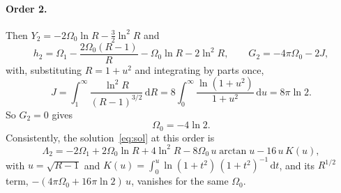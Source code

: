 \documentclass[11pt]{article}
\theoremstyle{remark}
\newcommand{\dd}{\mathrm{d}}
\begin{document}
\paragraph{Order 2.} Then $Y_2=-2\Omega_0\ln R-\tfrac32\ln^2R$ and
\begin{equation}
h_2=\Omega_1-\frac{2\Omega_0(R-1)}{R}-\Omega_0\ln R-2\ln^2R,\qquad G_2=-4\pi\Omega_0-2J,
\end{equation}
with, substituting $R=1+u^2$ and integrating by parts once,
\begin{equation}
J=\int_1^\infty\frac{\ln^2R}{(R-1)^{3/2}}\,\dd R=8\int_0^\infty\frac{\ln(1+u^2)}{1+u^2}\,\dd u=8\pi\ln2 .
\end{equation}
So $G_2=0$ gives
\begin{equation}
\Omega_0=-4\ln2.
\end{equation}
Consistently, the solution~\eqref{eq:sol} at this order is
\begin{equation}
\Lambda_2=-2\Omega_1+2\Omega_0\ln R+4\ln^2R-8\Omega_0\,u\arctan u-16\,u\,K(u),
\end{equation}
with $u=\sqrt{R-1}$ and $K(u)=\int_0^u\ln(1+t^2)\,(1+t^2)^{-1}\,\dd t$,
and its $R^{1/2}$ term, $-(4\pi\Omega_0+16\pi\ln2)\,u$, vanishes for the same $\Omega_0$.
\end{document}
